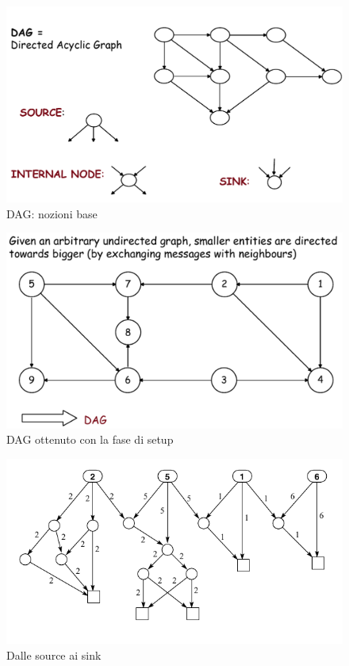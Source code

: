 \documentclass[12pt]{article}
\begin{document}
			\begin{figure}[h!]
				\centering
				\includegraphics[scale=0.30]{img/dag.png}
				\caption{DAG: nozioni base}
			\end{figure}
			\begin{figure}[h!]
				\centering
				\includegraphics[scale=0.30]{img/dpi.png}
				\caption{DAG ottenuto con la fase di setup}
			\end{figure}
			\begin{figure}[h!]
				\centering
				\includegraphics[scale=0.55]{img/yo.png}
				\caption{Dalle source ai sink}
			\end{figure}
\end{document}
